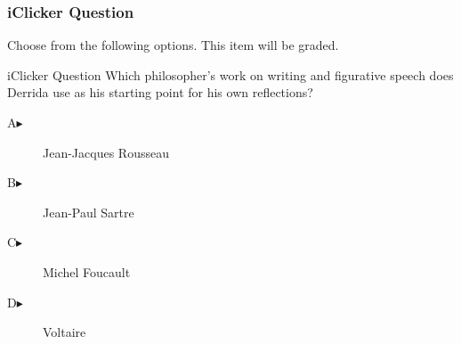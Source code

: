 \begin{frame}
  \frametitle{iClicker Question}
Choose from the following options. This item will be graded.
\begin{block}{iClicker Question}
Which philosopher's work on writing and figurative speech does Derrida
use as his starting point for his own reflections?
\end{block}
\begin{description}
\item[A\hspace{.2in}$\blacktriangleright$] Jean-Jacques Rousseau
\item[B\hspace{.2in}$\blacktriangleright$] Jean-Paul Sartre
\item[C\hspace{.2in}$\blacktriangleright$] Michel Foucault
\item[D\hspace{.2in}$\blacktriangleright$] Voltaire
\end{description}
\end{frame}
